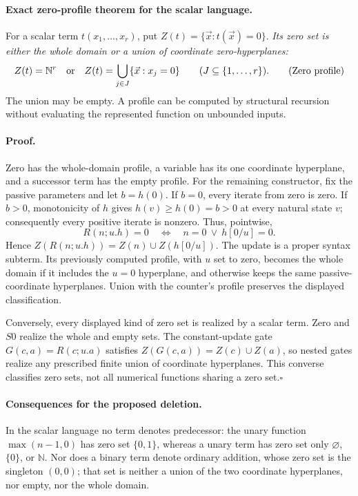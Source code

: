 \documentclass[11pt,letterpaper]{article}
\theoremstyle{definition}
\theoremstyle{remark}
\begin{document}
\paragraph{Exact zero-profile theorem for the scalar language.}
For a scalar term $t(x_1,\ldots,x_r)$, put
$Z(t)=\{\vec x:t(\vec x)=0\}$.
\emph{Its zero set is either the whole domain or a union of coordinate
zero-hyperplanes:}
\[
 Z(t)=\mathbb N^r
 \quad\hbox{or}\quad
 Z(t)=\bigcup_{j\in J}\{\vec x:x_j=0\}
 \qquad(J\subseteq\{1,\ldots,r\}).
 \tag{Zero profile}
\]
The union may be empty. A profile can be computed by structural recursion
without evaluating the represented function on unbounded inputs.

\paragraph{Proof.}
Zero has the whole-domain profile, a variable has its one coordinate
hyperplane, and a successor term has the empty profile. For the remaining
constructor, fix the passive parameters and let $b=h(0)$. If $b=0$,
every iterate from zero is zero. If $b>0$, monotonicity of $h$ gives
$h(v)\ge h(0)=b>0$ at every natural state $v$; consequently every
positive iterate is nonzero. Thus, pointwise,
\[
 R(n;u.h)=0
 \quad\Longleftrightarrow\quad
 n=0\ \lor\ h[0/u]=0.
 \tag{Zero recurrence}
\]
Hence $Z(R(n;u.h))=Z(n)\cup Z(h[0/u])$. The update is a proper syntax
subterm. Its previously computed profile, with $u$ set to zero, becomes
the whole domain if it includes the $u=0$ hyperplane, and otherwise keeps
the same passive-coordinate hyperplanes. Union with the counter's
profile preserves the displayed classification.

Conversely, every displayed kind of zero set is realized by a scalar
term. Zero and $S0$ realize the whole and empty sets. The constant-update
gate $G(c,a)=R(c;u.a)$ satisfies
$Z(G(c,a))=Z(c)\cup Z(a)$, so nested gates realize any prescribed finite
union of coordinate hyperplanes. This converse classifies zero sets,
not all numerical functions sharing a zero set.\hfill$\square$

\paragraph{Consequences for the proposed deletion.}
In the scalar language no term denotes predecessor: the unary function
$\max(n-1,0)$ has zero set $\{0,1\}$, whereas a unary term has zero set
only $\varnothing$, $\{0\}$, or $\mathbb N$. Nor does a binary term
denote ordinary addition, whose zero set is the singleton $(0,0)$;
that set is neither a union of the two coordinate hyperplanes, nor empty,
nor the whole domain.
\end{document}
